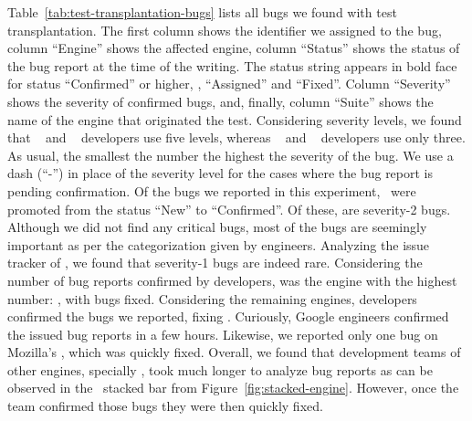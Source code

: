 \documentclass[smallextended]{svjour3}
\begin{document}
Table~\ref{tab:test-transplantation-bugs} lists all bugs we found with
test transplantation. The first column shows the identifier we
assigned to the bug, column ``Engine'' shows the
affected engine, column ``Status'' shows the status of the bug report
at the time of the writing. The status string appears in bold face for
status ``Confirmed'' or higher, \ie{}, ``Assigned'' and ``Fixed''.
Column ``Severity'' shows the severity of confirmed bugs, and,
finally, column ``Suite'' shows the name of the engine that originated
the test. Considering severity levels, we found that
\jsc~\cite{jsc-severity} and \smonkey{}~\cite{mozilla-severity}
developers use five levels, whereas \chakra{}~\cite{chakra-severity}
and \veight{}~\cite{v8-severity} developers use only three. As usual,
the smallest the number the highest the severity of the bug. We use a
dash (``-'') in place of the severity level for the cases where the
bug report is pending confirmation. Of the \noBugsTransplantation{}
bugs we reported in this experiment,
\noBugsTransplantationConfirmed\ were promoted from the status ``New''
to ``Confirmed''. Of these, \noBugsTransplantationSeverityTwo{} are
severity-2 bugs.  Although we did not find any critical bugs, most of
the bugs are seemingly important as per the categorization given by
engineers. Analyzing the issue tracker of \chakra, we found that
severity-1 bugs are indeed rare. Considering the number of bug reports
confirmed by developers, \chakra{} was the engine with the highest
number: \bugsChakra{}, with \bugsChakraFixed{} bugs fixed. Considering
the remaining engines, \veight{} developers confirmed the
\noTransVeightBugsReported{} bugs we reported, fixing
\noTransVeightBugsFixed{}. Curiously, Google engineers confirmed the
issued bug reports in a few hours. Likewise, we reported only one bug
on Mozilla's \smonkey, which was quickly fixed.  Overall, we found
that development teams of other engines, specially \jsc, took much
longer to analyze bug reports as can be observed in the \jsc\ stacked
bar from Figure~\ref{fig:stacked-engine}. However, once the team
confirmed those bugs they were then quickly fixed.

\end{document}
